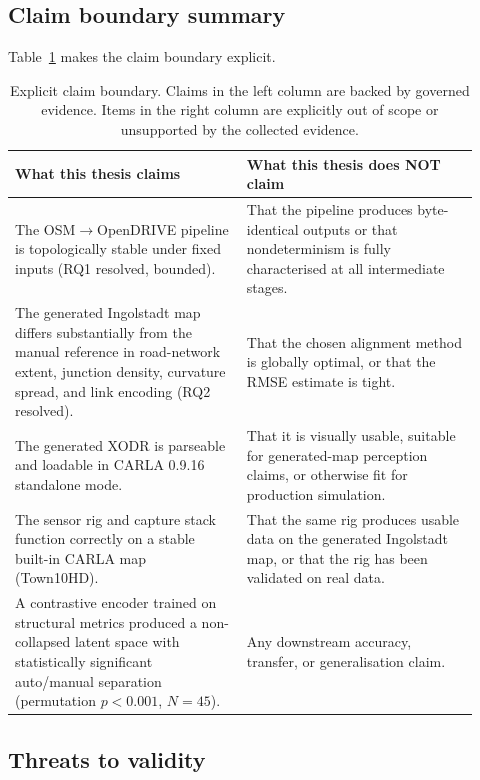 \subsection{Claim boundary summary}
\label{sec:claim_boundary}

Table~\ref{tab:claim_boundary} makes the claim boundary explicit.

\begin{table}[htbp]
\centering
\small
\begin{tabular}{@{}p{0.46\linewidth}p{0.46\linewidth}@{}}
\hline
\textbf{What this thesis claims} & \textbf{What this thesis does NOT claim} \\
\hline
The OSM$\to$OpenDRIVE pipeline is topologically stable under fixed inputs (RQ1 resolved, bounded). & That the pipeline produces byte-identical outputs or that nondeterminism is fully characterised at all intermediate stages. \\
\hline
The generated Ingolstadt map differs substantially from the manual reference in road-network extent, junction density, curvature spread, and link encoding (RQ2 resolved). & That the chosen alignment method is globally optimal, or that the RMSE estimate is tight. \\
\hline
The generated XODR is parseable and loadable in CARLA 0.9.16 standalone mode. & That it is visually usable, suitable for generated-map perception claims, or otherwise fit for production simulation. \\
\hline
The sensor rig and capture stack function correctly on a stable built-in CARLA map (Town10HD). & That the same rig produces usable data on the generated Ingolstadt map, or that the rig has been validated on real data. \\
\hline
A contrastive encoder trained on structural metrics produced a non-collapsed latent space with statistically significant auto/manual separation (permutation $p<0.001$, $N\!=\!45$). & Any downstream accuracy, transfer, or generalisation claim. \\
\hline
\end{tabular}
\caption[Explicit claim boundary for this thesis.]{Explicit claim boundary. Claims in the left column are backed by governed evidence. Items in the right column are explicitly out of scope or unsupported by the collected evidence.}
\label{tab:claim_boundary}
\end{table}

\subsection{Threats to validity}
\label{sec:threats_validity}

